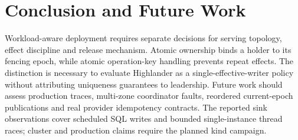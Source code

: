 \documentclass[conference,10pt]{IEEEtran}
\begin{document}
\section{Conclusion and Future Work}
Workload-aware deployment requires separate decisions for serving topology, effect discipline and release mechanism. Atomic ownership binds a holder to its fencing epoch, while atomic operation-key handling prevents repeat effects. The distinction is necessary to evaluate Highlander as a single-effective-writer policy without attributing uniqueness guarantees to leadership. Future work should assess production traces, multi-zone coordinator faults, reordered current-epoch publications and real provider idempotency contracts. The reported sink observations cover scheduled SQL writes and bounded single-instance thread races; cluster and production claims require the planned kind campaign.


\end{document}
